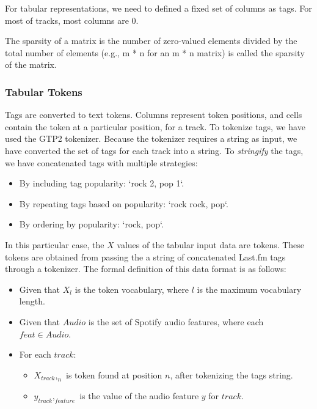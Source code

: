 \documentclass[sn-mathphys]{sn-jnl}%
\theoremstyle{thmstyleone}%
\theoremstyle{thmstyletwo}%
\theoremstyle{thmstylethree}%
\begin{document}
For tabular representations, we need to defined a fixed set of columns as tags.
For most of tracks, most columns are 0.

The sparsity of a matrix is the number of zero-valued elements divided by the total number of elements
(e.g., m * n for an m * n matrix) is called the sparsity of the matrix.


\subsubsection{Tabular Tokens}

Tags are converted to text tokens. Columns represent token positions, and cells contain the token at a particular position, for a track.
To tokenize tags, we have used the GTP2 tokenizer.
Because the tokenizer requires a string as input, we have converted the set of tags for each track into a string.
To \emph{stringify} the tags, we have concatenated tags with multiple strategies:

\begin{itemize}
      \item By including tag popularity: `rock 2, pop 1`.
      \item By repeating tags based on popularity: `rock rock, pop`.
      \item By ordering by popularity: `rock, pop`.
\end{itemize}


In this particular case, the $X$ values of the tabular input data are tokens.
These tokens are obtained from passing the a string of concatenated Last.fm tags through a tokenizer.
The formal definition of this data format is as follows:

\begin{itemize}
      \item Given that $X_l$ is the token vocabulary, where $l$ is the maximum vocabulary length.
      \item Given that $Audio$ is the set of Spotify audio features, where each $feat \in Audio$.
      \item For each $track$:
      \begin{itemize}
            \item $X_{track},_{n}$ is token found at position $n$, after tokenizing the tags string.
            \item $y_{track},_{feature}$ is the value of the audio feature $y$ for $track$.
      \end{itemize}
\end{itemize}
\end{document}
